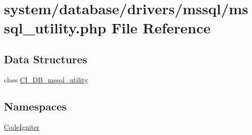 \hypertarget{mssql__utility_8php}{}\section{system/database/drivers/mssql/mssql\+\_\+utility.php File Reference}
\label{mssql__utility_8php}
\subsection*{Data Structures}
\begin{DoxyCompactItemize}
\item 
class \mbox{\hyperlink{class_c_i___d_b__mssql__utility}{C\+I\+\_\+\+D\+B\+\_\+mssql\+\_\+utility}}
\end{DoxyCompactItemize}
\subsection*{Namespaces}
\begin{DoxyCompactItemize}
\item 
 \mbox{\hyperlink{namespace_code_igniter}{Code\+Igniter}}
\end{DoxyCompactItemize}

